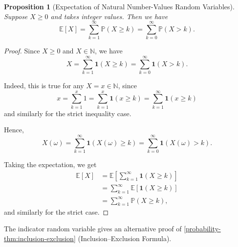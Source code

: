 \documentclass[11pt]{article}
\numberwithin{equation}{section}
\newtheorem{proposition}[theorem]{Proposition}
\theoremstyle{definition}
\theoremstyle{remark}
\newcommand{\pqty}[1]{\left(#1\right)}
\newcommand{\bqty}[1]{\left[#1\right]}
\newcommand{\NN}{\mathbb N}
\newcommand{\indicator}{\mathbf 1}
\newcommand{\Prob}{\mathbb P}
\newcommand{\Expt}{\mathbb E}
\begin{document}
\begin{proposition}[Expectation of Natural Number-Values Random Variables]\label{probability-proposition-009}
    \label{probability-prop:expt-natural-number-random-variable}%
    Suppose \(X \geq 0\) and takes integer values. Then we have
    \[
        \Expt\bqty{X} = \sum_{k = 1}^{\infty} \Prob\pqty{X \geq k} = \sum_{k = 0}^{\infty} \Prob\pqty{X > k}.
    \]
\end{proposition}

\begin{proof}\label{probability-proof-019}
    Since \(X \geq 0\) and \(X \in \NN\), we have
    \[
        X = \sum_{k = 1}^{\infty} \indicator \pqty{X \geq k} = \sum_{k = 0}^{\infty} \indicator \pqty{X > k}.
    \]

    Indeed, this is true for any \(X = x \in \NN\), since
    \[
        x = \sum_{k = 1}^{x} 1 = \sum_{k = 1}^{x} \indicator \pqty{x \geq k} = \sum_{k = 1}^{\infty} \indicator \pqty{x \geq k}
    \]
    and similarly for the strict inequality case.

    Hence,
    \[
        X \pqty{\omega} = \sum_{k = 1}^{\infty} \indicator \pqty{X \pqty{\omega} \geq k} = \sum_{k = 0}^{\infty} \indicator \pqty{X \pqty{\omega} > k}.
    \]

    Taking the expectation, we get
    \begin{align*}
        \Expt\bqty{X} &= \Expt\bqty{\sum_{k = 1}^{\infty} \indicator\pqty{X \geq k}} \\
        &= \sum_{k = 1}^{\infty} \Expt\bqty{\indicator\pqty{X \geq k}} \\
        &= \sum_{k = 1}^{\infty} \Prob\pqty{X \geq k},
    \end{align*}
    and similarly for the strict case.
\end{proof}

The indicator random variable gives an alternative proof of \autoref{probability-thm:inclusion-exclusion} (Inclusion--Exclusion Formula).
\end{document}
